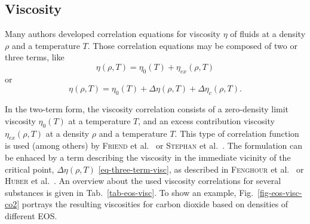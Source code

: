       
\subsection {Viscosity} 
\label{sec-viscosity}

Many authors developed correlation equations for viscosity $\eta$ of fluids at a density $\rho$ and a temperature $T$. Those correlation equations may be composed of two or three terms, like
%
\begin{equation}
\eta (\rho,T) = \eta_{0} (T) + \eta_{ex} (\rho,T)
	\label{eq-two-term-visc}
\end{equation}
%
or
%
\begin{equation}
\eta (\rho,T) = \eta_{0} (T) + \Delta \eta (\rho,T) + \Delta \eta_c (\rho,T).
	\label{eq-three-term-visc}
\end{equation}

In the two-term form, the viscosity correlation consists of a zero-density limit viscosity $\eta_0(T)$ at a temperature $T$, and an excess contribution viscosity $\eta_{ex}(\rho,T)$ at a density $\rho$ and a temperature $T$. This type of correlation function is used (among others) by \textsc{Friend} et al.\ \cite{FriElyIng:89} or \textsc{Stephan} et al.\ \cite{SteKraLae:87}. The formulation can be enhaced by a term describing the viscosity in the immediate vicinity of the critical point, $\Delta \eta (\rho,T)$ \eqref{eq-three-term-visc}, as described in \textsc{Fenghour} et al.\ \cite{FenWakVes:98} or \textsc{Huber} et al.\ \cite{IAPWS:08a}. An overview about the used viscosity correlations for several substances is given in Tab.~\ref{tab-eos-visc}. To show an example, Fig.~\ref{fig-eos-visc-co2} portrays the resulting viscosities for carbon dioxide based on densities of different EOS.


